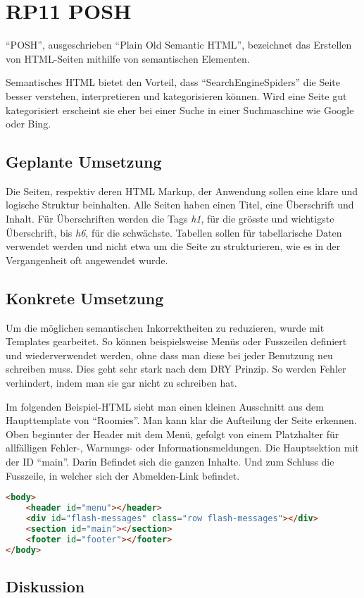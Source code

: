 \section{RP11 POSH}
\label{sec:principle-rp11-posh}

``POSH'', ausgeschrieben ``Plain Old Semantic HTML'', bezeichnet das Erstellen von HTML-Seiten mithilfe von semantischen Elementen. \cite{SemanticHTML}

Semantisches HTML bietet den Vorteil, dass ``\glspl{SearchEngineSpider}'' die Seite besser verstehen, interpretieren und kategorisieren können. Wird eine Seite gut kategorisiert erscheint sie eher bei einer Suche in einer Suchmaschine wie Google oder Bing.

\subsection*{Geplante Umsetzung}
Die Seiten, respektiv deren HTML Markup, der Anwendung sollen eine klare und logische Struktur beinhalten.
Alle Seiten haben einen Titel, eine Überschrift und Inhalt.
Für Überschriften werden die Tags \emph{h1}, für die grösste und wichtigste Überschrift, bis \emph{h6}, für die schwächste.
Tabellen sollen für tabellarische Daten verwendet werden und nicht etwa um die Seite zu strukturieren, wie es in der Vergangenheit oft angewendet wurde.

\subsection*{Konkrete Umsetzung}
Um die möglichen semantischen Inkorrektheiten zu reduzieren, wurde mit Templates gearbeitet. So können beispielsweise Menüs oder Fusszeilen definiert und wiederverwendet werden, ohne dass man diese bei jeder Benutzung neu schreiben muss. Dies geht sehr stark nach dem \gls{DRY} Prinzip. So werden Fehler verhindert, indem man sie gar nicht zu schreiben hat.

Im folgenden Beispiel-HTML sieht man einen kleinen Ausschnitt aus dem Haupttemplate von ``Roomies''. Man kann klar die Aufteilung der Seite erkennen. Oben beginnter der Header mit dem Menü, gefolgt von einem Platzhalter für allfälligen Fehler-, Warnungs- oder Informationsmeldungen. Die Hauptsektion mit der ID ``main''. Darin Befindet sich die ganzen Inhalte. Und zum Schluss die Fusszeile, in welcher sich der Abmelden-Link befindet.

\begin{lstlisting}[language=HTML, caption=Layout Definition \cite{roomiesHtmlSkeleton}, label=lst:layoutDefinition, firstnumber=27]
<body>
	<header id="menu"></header>
	<div id="flash-messages" class="row flash-messages"></div>
	<section id="main"></section>
	<footer id="footer"></footer>
</body>
\end{lstlisting}

\subsection*{Diskussion}

